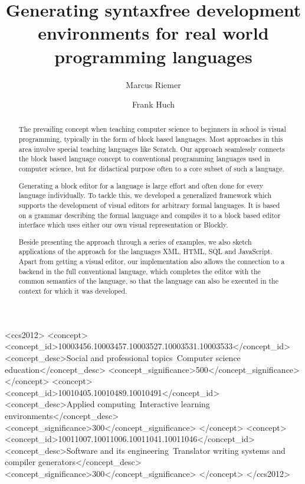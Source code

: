 \documentclass[sigconf,natbib=false]{acmart}
\begin{document}
\title[]{Generating syntaxfree development environments for real world programming languages}

\author{Marcus Riemer}

\author{Frank Huch}

\begin{CCSXML}
<ccs2012>
   <concept>
       <concept_id>10003456.10003457.10003527.10003531.10003533</concept_id>
       <concept_desc>Social and professional topics~Computer science education</concept_desc>
       <concept_significance>500</concept_significance>
       </concept>
   <concept>
       <concept_id>10010405.10010489.10010491</concept_id>
       <concept_desc>Applied computing~Interactive learning environments</concept_desc>
       <concept_significance>300</concept_significance>
       </concept>
   <concept>
       <concept_id>10011007.10011006.10011041.10011046</concept_id>
       <concept_desc>Software and its engineering~Translator writing systems and compiler generators</concept_desc>
       <concept_significance>300</concept_significance>
       </concept>
 </ccs2012>
\end{CCSXML}



\begin{abstract}
  The prevailing concept when teaching computer science to beginners in school is visual programming, typically in the form of block based languages. Most approaches in this area involve special teaching languages like Scratch. Our approach seamlessly connects the block based language concept to conventional programming languages used in computer science, but for didactical purpose often to a core subset of such a language.

  Generating a block editor for a language is large effort and often done for every language individually. To tackle this, we developed a generalized framework which supports the development of visual editors for arbitrary formal languages. It is based on a grammar describing the formal language and compiles it to a block based editor interface which uses either our own visual representation or Blockly.

  Beside presenting the approach through a series of examples, we also sketch applications of the approach for the languages XML, HTML, SQL and JavaScript. Apart from getting a visual editor, our implementation also allows the connection to a backend in the full conventional language, which completes the editor with the common semantics of the language, so that the language can also be executed in the context for which it was developed.
\end{abstract}
\end{document}
